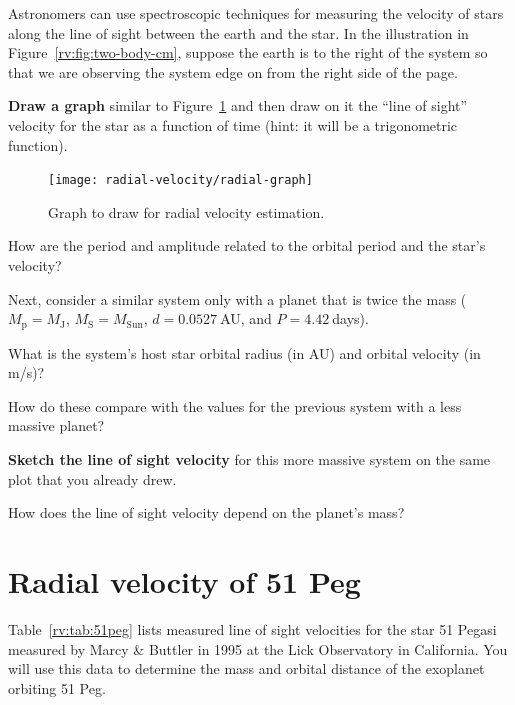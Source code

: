 Astronomers can use spectroscopic techniques for measuring the velocity of stars along the line of sight between the earth and the star. In the illustration in Figure~\ref{rv:fig:two-body-cm}, suppose the earth is to the right of the system so that we are observing the system edge on from the right side of the page. 

\begin{steps}
	\item \textbf{Draw a graph} similar to Figure~\ref{rv:fig:graph} and then draw on it the ``line of sight'' velocity for the star as a function of time (hint: it will be a trigonometric function).
\end{steps}

\begin{figure}
	\centering
	\texttt{[image: radial-velocity/radial-graph]}
	\caption{Graph to draw for radial velocity estimation.}\label{rv:fig:graph}
\end{figure}

\begin{steps}
	\item How are the period and amplitude related to the orbital period and the star’s velocity?
\end{steps}

Next, consider a similar system only with a planet that is twice the mass ($M_\textrm{p} = M_\textrm{J}$, $M_\textrm{S} = M_\textrm{Sun}$, $d = 0.0527\:$AU, and $P = 4.42\:$days).


\begin{steps}
	\item What is the system's host star orbital radius (in AU) and orbital velocity (in m/s)?
	
	\item How do these compare with the values for the previous system with a less massive planet?

	\item \textbf{Sketch the line of sight velocity} for this more massive system on the same plot that you already drew.

	\item How does the line of sight velocity depend on the planet’s mass?
\end{steps}

\section{Radial velocity of 51 Peg}

Table~\ref{rv:tab:51peg} lists measured line of sight velocities for the star 51 Pegasi measured by Marcy \& Buttler in 1995 at the Lick Observatory in California. You will use this data to determine the mass and orbital distance of the exoplanet orbiting 51 Peg.

